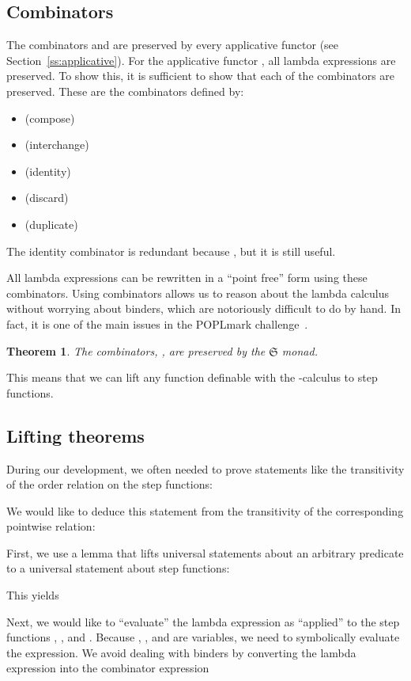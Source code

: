 \documentclass{elsarticle}
\newcommand{\tmstrong}[1]{\textbf{#1}}
\newcommand{\tmtextup}[1]{{\upshape{#1}}}
\newtheorem{theorem}{Theorem}
\newcommand{\SF}{\ensuremath{\mathfrak{S}}}
\newcommand{\comp}{\text{{\tmstrong{\tmtextup{B}}}}}
\newcommand{\flip}{\text{{\tmstrong{\tmtextup{C}}}}}
\newcommand{\id}{\text{{\tmstrong{\tmtextup{I}}}}}
\newcommand{\const}{\text{{\tmstrong{\tmtextup{K}}}}}
\newcommand{\diag}{\text{{\tmstrong{\tmtextup{W}}}}}
\begin{document}
\subsection{Combinators}\label{ss:Combinator}The
combinators {\comp} and {\id} are preserved by every
applicative functor (see Section~\ref{ss:applicative}). For the applicative
functor , all lambda expressions are preserved. To show this, it is
sufficient to show that each of the {\comp}{\flip}{\const}{\diag} combinators
are preserved. These are the combinators defined by:
\begin{itemize}
  \item  (compose)
  \item  (interchange)
  \item  (identity)
  \item  (discard)
  \item  (duplicate)
\end{itemize}
The identity combinator is redundant because , but it
is still useful.

All lambda expressions can be rewritten in a ``point free'' form using these
combinators. Using combinators allows us to reason about the lambda calculus
without worrying about binders, which are notoriously difficult to do by hand.
In fact, it is one of the main issues in the POPLmark
challenge~{\cite{aydemir05mechanized}}.

\begin{theorem}
  The combinators, {\flip}{\const}{\diag}, are preserved by the
  {\SF} monad.
  
\end{theorem}

This means that we can lift any function definable with the -calculus
to step functions.

\subsection{Lifting theorems}\label{ss:liftingTheorems}During our development,
we often needed to prove statements like the transitivity of the order
relation on the step functions:

We would like to deduce this statement from the transitivity of the
corresponding pointwise relation:

First, we use a lemma that lifts universal statements about an arbitrary
predicate  to a universal
statement about step functions:

This yields

Next, we would like to ``evaluate'' the lambda expression as ``applied'' to
the step functions , , and . Because , , and  are variables,
we need to symbolically evaluate the expression. We avoid dealing with binders
by converting the lambda expression into the combinator expression
\end{document}
